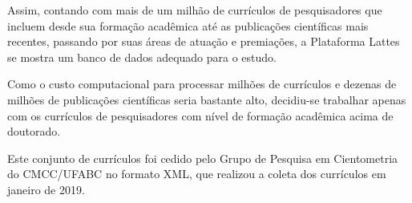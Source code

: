 Assim, contando com mais de um milhão de currículos de pesquisadores que incluem desde sua formação acadêmica até as publicações científicas mais recentes, passando por suas áreas de atuação e premiações, a Plataforma Lattes se mostra um banco de dados adequado para o estudo.

Como o custo computacional para processar milhões de currículos e dezenas de milhões de publicações científicas seria bastante alto, decidiu-se trabalhar apenas com os currículos de pesquisadores com nível de formação acadêmica acima de doutorado.

Este conjunto de currículos foi cedido pelo Grupo de Pesquisa em Cientometria do CMCC/UFABC no formato XML, que realizou a coleta dos currículos em janeiro de 2019.
